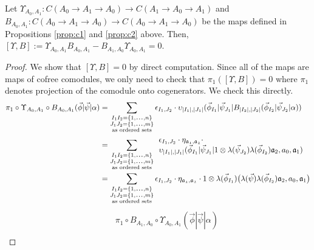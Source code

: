 \begin{prop}
\label{prop:c3}
Let $\Upsilon_{A_0,A_1}: 
C(A_0 \to A_1 \to A_0) \longrightarrow
C(A_1 \to A_0 \to A_1)$ and 
$B_{A_0,A_1}:C(A_0 \to A_1 \to A_0) 
\longrightarrow C(A_0 \to A_1 \to A_0)$ 
be the maps defined in Propositions 
\ref{prop:c1} and \ref{prop:c2} above. 
Then, $[\Upsilon, B] := 
\Upsilon_{A_0,A_1} B_{A_0,A_1} - 
B_{A_1,A_0}\Upsilon_{A_0,A_1} = 0$.
\end{prop}
%
\begin{proof}
We show that $[\Upsilon, B] = 0$ by direct 
computation. Since all of the maps are maps 
of cofree comodules, we only need to check 
that $\pi_1([\Upsilon, B]) = 0$ where 
$\pi_1$ denotes projection of the comodule 
onto cogenerators. We check this directly.
%
\begin{align*}
\pi_1 \circ \Upsilon_{A_0,A_1} \circ B_{A_0,A_1} 
  (\vec{\phi} | \vec{\psi} | \alpha ) 
&= 
\sum \limits_{\substack{
  I_1I_2 = \{1,\smdots,n\}\\
  J_1J_2 = \{1,\smdots,m\}\\
  \textrm{as ordered sets}}}
\epsilon_{I_1,J_2} \cdot
  \upsilon_{|I_1|, |J_1|} (\vec{\phi}_{I_1} | \vec{\psi}_{J_1} | 
    B_{|I_2|, |J_2|} (\vec{\phi}_{I_2} | \vec{\psi}_{J_2} | \alpha)) \\
&= 
\sum \limits_{\substack{
  I_1I_2 = \{1,\smdots,n\}\\
  J_1J_2 = \{1,\smdots,m\}\\
  \textrm{as ordered sets}}}
\begin{array}{l}  
\epsilon_{I_1,J_2} \cdot 
\eta_{\mathfrak{a_1},\mathfrak{a_2}} \cdot\\
\upsilon_{|I_1|, |J_1|} (\vec{\phi}_{I_1} | \vec{\psi}_{J_1} | 
  1 \otimes \lambda(\vec{\psi}_{J_2}) \lambda(\vec{\phi}_{I_2}) 
  \mathfrak{a}_2, a_0, \mathfrak{a}_1)
\end{array} \\
&= 
\sum \limits_{\substack{
  I_1I_2 = \{1,\smdots,n\}\\
  J_1J_2 = \{1,\smdots,m\}\\
  \textrm{as ordered sets}}}
\epsilon_{I_1,J_2} \cdot 
\eta_{\mathfrak{a_1},\mathfrak{a_2}} \cdot
1 \otimes \lambda(\vec{\phi}_{I_1}) \big( 
  \lambda(\vec{\psi}) \lambda(\vec{\phi}_{I_2}) 
  \mathfrak{a}_2, a_0, \mathfrak{a}_1 \big)
\end{align*}
%
\begin{align*}
& \phantom{{}={}}
\pi_1 \circ B_{A_1,A_0} \circ \Upsilon_{A_0,A_1} 
  (\vec{\phi} | \vec{\psi} | \alpha ) \\

\end{align*}
\end{proof}
